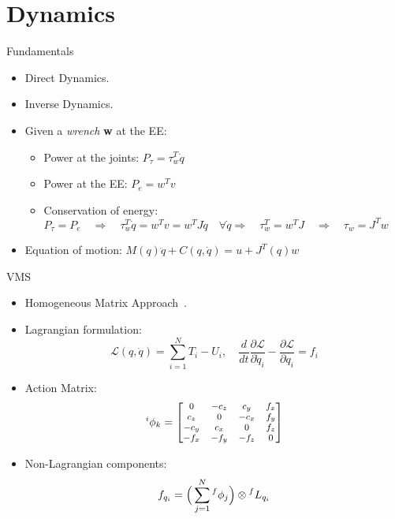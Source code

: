 \section{Dynamics}

\begin{frame}{Fundamentals}
    \begin{itemize}
        \item Direct Dynamics.
        \item Inverse Dynamics.
        \item Given a \textit{wrench} \textbf{w} at the EE:
        \begin{itemize}
            \item Power at the joints: $P_{\tau}=\tau_w^T\dot{q}$
            \item Power at the EE: $P_e=w^Tv$
            \item Conservation of energy: \\
            \vspace{2mm}
            $P_{\tau}=P_e \quad \Rightarrow \quad  \tau_w^T\dot{q}=w^Tv=w^TJ\dot{q} \quad \forall\dot{q}\Rightarrow \quad  \tau_w^T=w^TJ \quad \Rightarrow \quad \tau_w=J^Tw $
        \end{itemize}
        \vspace{1mm}
        \item Equation of motion: $ M(q)\ddot{q}+C(q,\dot{q})=u+J^T(q)w$
    \end{itemize}
\end{frame}

\begin{frame}{VMS}
\begin{itemize}
    \item Homogeneous Matrix Approach~\cite{hma1,hma2}.
    \item Lagrangian formulation: 
    \begin{equation} 
        \mathcal{L} (q,\dot{q}) = \sum_{i=1}^NT_i-U_i, \quad  \frac{d}{dt}\frac{\partial \mathcal{L} }{\partial \dot{q}_i}-\frac{\partial \mathcal{L} }{\partial q_i}=f_i 
    \end{equation}
    \item Action Matrix:
    \begin{equation}
        \begin{footnotesize}
        \prescript{i}{}{\phi}_k=\begin{bmatrix}
          0&-c_z&c_y&f_x\\
          c_z&0&-c_x&f_y\\
          -c_y&c_x&0&f_z\\
          -f_x&-f_y&-f_z&0
        \end{bmatrix}
        \end{footnotesize}
      \end{equation}
    \item Non-Lagrangian components:
    \begin{equation}
        f_{q_i}=\Big(\sum_{j=1}^N\prescript{f}{}{\phi_j}\Big)\otimes \prescript{f}{}{L_{q_i}}
      \end{equation}
\end{itemize}
\end{frame}

